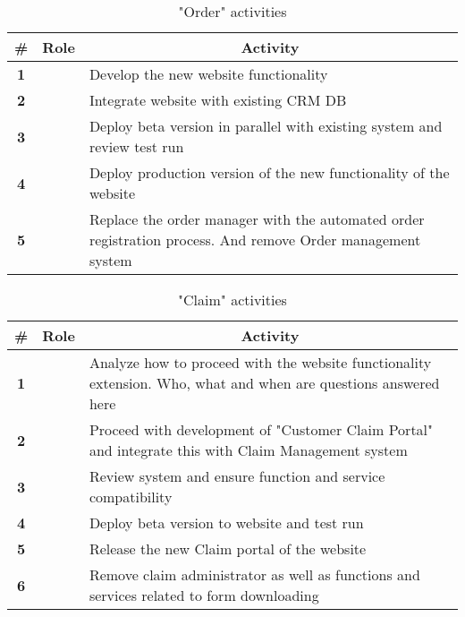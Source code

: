 \begin{table}[H]
	\centering
	\begin{tabular}{|c|p{3cm}|p{10.5cm}|}
		\hline
		\textbf{\#} & \multicolumn{1}{c|}{\textbf{Role}} & \multicolumn{1}{c|}{\textbf{Activity}} \\ \hline
		\textbf{1} &  & Develop the new website functionality \\ \hline
		\textbf{2} &  & Integrate website with existing CRM DB\\ \hline
		\textbf{3} &  & Deploy beta version in parallel with existing system and review test run \\ \hline
		\textbf{4} &  & Deploy production version of the new functionality of the website \\ \hline
		\textbf{5} &  & Replace the order manager with the automated order registration process. And remove Order management system\\ \hline

	\end{tabular}	
	\caption{"Order" activities}
	\label{table:activities_order}
\end{table}

\begin{table}[H]
	\centering
	\begin{tabular}{|c|p{3cm}|p{10.5cm}|}
		\hline
		\textbf{\#} & \multicolumn{1}{c|}{\textbf{Role}} & \multicolumn{1}{c|}{\textbf{Activity}} \\ \hline
		\textbf{1} &  & Analyze how to proceed with the website functionality extension. Who, what and when are questions answered here  \\ \hline
		\textbf{2} &  & Proceed with development of "Customer Claim Portal" and integrate this with Claim Management system\\ \hline
		\textbf{3} &  & Review system and ensure function and service compatibility \\ \hline
		\textbf{4} &  & Deploy beta version to website and test run \\ \hline
		\textbf{5} &  & Release the new Claim portal of the website\\ \hline
		\textbf{6} &  & Remove claim administrator as well as functions and services related to form downloading\\ \hline
	\end{tabular}	
	\caption{"Claim" activities}
	\label{table:activities_claim}
\end{table}

